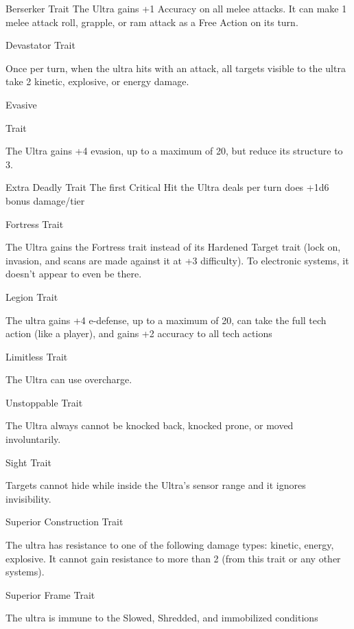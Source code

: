                                                                                                             


Berserker  
Trait  
The Ultra gains +1 Accuracy on all melee attacks. It can make 1 melee attack roll, grapple, or  
ram attack as a Free Action on its turn.
 

Devastator  
Trait
 
Once per turn, when the ultra hits with an attack, all targets visible to the ultra take 2 kinetic,  
explosive, or energy damage.
 

Evasive
 
Trait
 
The Ultra gains +4 evasion, up to a maximum of 20, but reduce its structure to 3.
 

Extra Deadly  
Trait  
The first Critical Hit the Ultra deals per turn does +1d6 bonus damage/tier
 

Fortress  
Trait
 
The Ultra gains the Fortress trait instead of its Hardened Target trait (lock on, invasion, and scans  
are made against it at +3 difficulty). To electronic systems, it doesn’t appear to even be there.
 

Legion  
Trait
 
The ultra gains +4 e-defense, up to a maximum of 20, can take the full tech action (like a player),  
and gains +2 accuracy to all tech actions
 

Limitless  
Trait
 
The Ultra can use overcharge.
 

Unstoppable  
Trait
 
The Ultra always cannot be knocked back, knocked prone, or moved involuntarily.
 

Sight  
Trait
 
Targets cannot hide while inside the Ultra’s sensor range and it ignores invisibility.
 

Superior Construction  
Trait
 
The ultra has resistance to one of the following damage types: kinetic, energy, explosive. It  
cannot gain resistance to more than 2 (from this trait or any other systems).
 

                                                                                                                        


Superior Frame  
Trait
 
The ultra is immune to the Slowed, Shredded, and immobilized conditions
 

